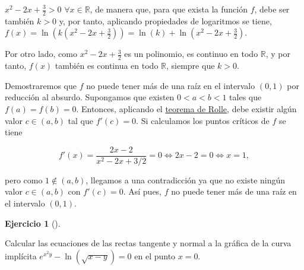 \documentclass[
  spanish,
  a4paper,
]{scrreport}
\theoremstyle{definition}
\newtheorem{exercise}{Ejercicio}[chapter]
\theoremstyle{remark}
\begin{document}
\begin{tcolorbox}[enhanced jigsaw, arc=.35mm, bottomrule=.15mm, bottomtitle=1mm, breakable, colback=white, colbacktitle=quarto-callout-tip-color!10!white, colframe=quarto-callout-tip-color-frame, coltitle=black, left=2mm, leftrule=.75mm, opacityback=0, opacitybacktitle=0.6, rightrule=.15mm, title=\textcolor{quarto-callout-tip-color}{\faLightbulb}\hspace{0.5em}{Solución}, titlerule=0mm, toprule=.15mm, toptitle=1mm]

\(x^2-2x+\frac{3}{2}>0\) \(\forall x\in\mathbb{R}\), de manera que, para
que exista la función \(f\), debe ser también \(k>0\) y, por tanto,
aplicando propiedades de logaritmos se tiene,
\(f(x)=\ln\left(k\left(x^2-2x+\frac{3}{2}\right)\right)= \ln(k)+\ln\left(x^2-2x+\frac{3}{2}\right)\).

Por otro lado, como \(x^2-2x+\frac{3}{2}\) es un polinomio, es continuo
en todo \(\mathbb{R}\), y por tanto, \(f(x)\) también es continua en
todo \(\mathbb{R}\), siempre que \(k>0\).

Demostraremos que \(f\) no puede tener más de una raíz en el intervalo
\((0,1)\) por reducción al absurdo. Supongamos que existen
\(0 < a < b < 1\) tales que \(f(a)=f(b)=0\). Entonces, aplicando el
\href{https://aprendeconalf.es/analisis-manual/derivadas.html\#thm-rolle}{teorema
de Rolle}, debe existir algún valor \(c\in(a,b)\) tal que \(f'(c)=0\).
Si calculamos los puntos críticos de \(f\) se tiene

\[
f'(x) = \frac{2x-2}{x^2-2x+3/2} = 0 \Leftrightarrow 2x-2=0 \Leftrightarrow x=1,
\]

pero como \(1\not \in (a,b)\), llegamos a una contradicción ya que no
existe ningún valor \(c\in(a,b)\) con \(f'(c)=0\). Así pues, \(f\) no
puede tener más de una raíz en el intervalo \((0,1)\).

\end{tcolorbox}

\begin{exercise}[]\protect\hypertarget{exr-10}{}\label{exr-10}

Calcular las ecuaciones de las rectas tangente y normal a la gráfica de
la curva implícita \(e^{x^2y}-\ln(\sqrt{x-y})= 0\) en el punto \(x=0\).

\end{exercise}
\end{document}
